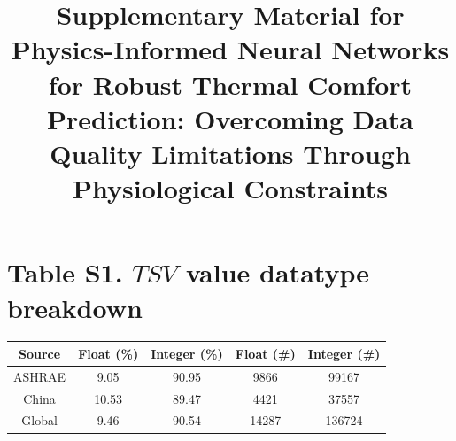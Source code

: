 \documentclass[1p]{elsarticle}
\title{Supplementary Material for \\ Physics-Informed Neural Networks for Robust Thermal Comfort Prediction: Overcoming Data Quality Limitations Through Physiological Constraints}
\date{}
\begin{document}
\maketitle

\section*{Table S1. $TSV$ value datatype breakdown}
\begin{table}[htbp]
    \centering
    \begin{tabular}{|c|c|c|c|c|}
    \hline
    Source & Float (\%) & Integer (\%) & Float (\#) & Integer (\#) \\
    \hline
    ASHRAE & 9.05 & 90.95 & 9866 & 99167 \\\hline
    China & 10.53 & 89.47 & 4421 & 37557 \\\hline
    Global & 9.46 & 90.54 & 14287 & 136724 \\\hline
    \end{tabular}
    \label{tab:int-float}
\end{table}
\end{document}
